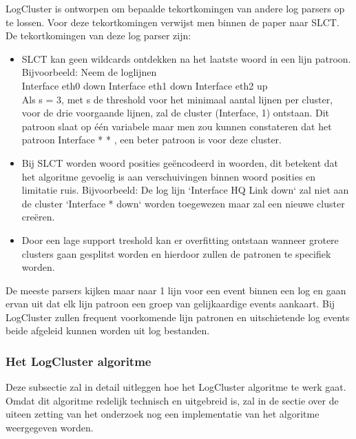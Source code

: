 LogCluster is ontworpen om bepaalde tekortkomingen van andere log parsers op te lossen. Voor deze tekortkomingen verwijst men binnen de paper naar SLCT. De tekortkomingen van deze log parser zijn:
\begin{itemize}
    \item SLCT kan geen wildcards ontdekken na het laatste woord in een lijn patroon. Bijvoorbeeld: Neem de loglijnen \\
    Interface eth0 down
    Interface eth1 down
    Interface eth2 up \\
    Als s = 3, met s de threshold voor het minimaal aantal lijnen per cluster, voor de drie voorgaande lijnen, zal de cluster {(Interface, 1)} ontstaan. Dit patroon slaat op één variabele maar men zou kunnen constateren dat het patroon Interface * * , een beter patroon is voor deze cluster.
    \item Bij SLCT worden woord posities geëncodeerd in woorden, dit betekent dat het algoritme gevoelig is aan verschuivingen binnen woord posities en limitatie ruis. Bijvoorbeeld: De log lijn `Interface HQ Link down` zal niet aan de cluster `Interface * down` worden toegewezen maar zal een nieuwe cluster creëren.
    \item Door een lage support treshold kan er overfitting ontstaan wanneer grotere clusters gaan gesplitst worden en hierdoor zullen de patronen te specifiek worden.
\end{itemize} 
De meeste parsers kijken maar naar 1 lijn voor een event binnen een log en gaan ervan uit dat elk lijn patroon een groep van gelijkaardige events aankaart. Bij LogCluster zullen frequent voorkomende lijn patronen en uitschietende log events beide afgeleid kunnen worden uit log bestanden. 

\subsubsection{Het LogCluster algoritme}
Deze subsectie zal in detail uitleggen hoe het LogCluster algoritme te werk gaat. Omdat dit algoritme redelijk technisch en uitgebreid is, zal in de sectie over de uiteen zetting van het onderzoek nog een implementatie van het algoritme weergegeven worden.

